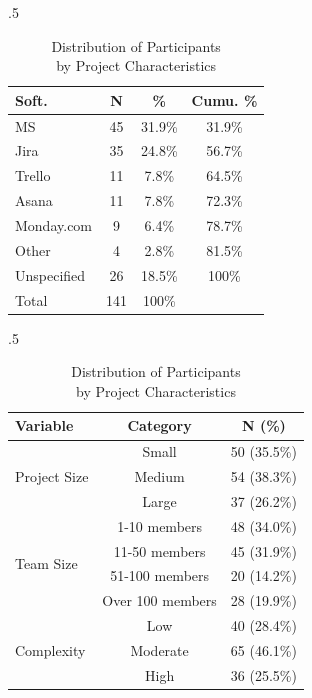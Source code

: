 \documentclass[runningheads]{llncs}
\begin{document}
\begin{table}[htb]%
    \caption{Global caption}
    \begin{subtable}[t]{.5\textwidth}
        \caption{Distribution of Participants\\ by Software Used}
        \raggedright
            \begin{tabular}{l c c c}
\toprule
\textbf{Soft.} & \textbf{N} & \textbf{\%} & \textbf{Cumu. \%} \\
\midrule
MS & 45 & 31.9\% & 31.9\% \\
Jira & 35 & 24.8\% & 56.7\% \\
Trello & 11 & 7.8\% & 64.5\% \\
Asana & 11 & 7.8\% & 72.3\% \\
Monday.com & 9 & 6.4\% & 78.7\% \\
Other & 4 & 2.8\% & 81.5\% \\
Unspecified & 26 & 18.5\% & 100\% \\
\midrule
Total & 141 & 100\% & \\
\bottomrule
\end{tabular}
    \end{subtable}%
   \begin{subtable}[t]{.5\textwidth}
        \raggedleft
        \caption{Distribution of Participants\\ by Project Characteristics}
        \begin{tabular}{l c c}
\toprule
\textbf{Variable} & \textbf{Category} & \textbf{N (\%)} \\
\midrule
\multirow{3}{*}{Project Size} & Small & 50 (35.5\%) \\
& Medium & 54 (38.3\%) \\
& Large & 37 (26.2\%) \\
\midrule
\multirow{4}{*}{Team Size} & 1-10 members & 48 (34.0\%) \\
& 11-50 members & 45 (31.9\%) \\
& 51-100 members & 20 (14.2\%) \\
& Over 100 members & 28 (19.9\%) \\
\midrule
\multirow{3}{*}{Complexity} & Low & 40 (28.4\%) \\
& Moderate & 65 (46.1\%) \\
& High & 36 (25.5\%) \\
\bottomrule
\end{tabular}
    \end{subtable}
\end{table}
\end{document}
